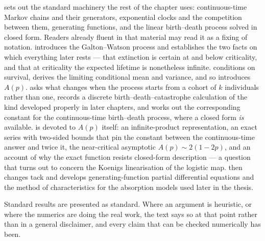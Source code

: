  sets out the standard machinery the rest of the chapter uses:
continuous-time Markov chains and their generators, exponential clocks and the
competition between them, generating functions, and the linear birth--death process
solved in closed form. Readers already fluent in that material may read it as a fixing
of notation.  introduces the Galton--Watson process and establishes the
two facts on which everything later rests --- that extinction is certain at and below
criticality, and that at criticality the expected lifetime is nonetheless infinite.
 conditions on survival, derives the limiting conditional mean and
variance, and so introduces $A(p)$.  asks what changes when the process
starts from a cohort of $k$ individuals rather than one, records a discrete
birth--death--catastrophe calculation of the kind developed properly in later chapters,
and works out the corresponding constant for the continuous-time birth--death process,
where a closed form \emph{is} available.  is devoted to $A(p)$ itself: an
infinite-product representation, an exact series with two-sided bounds that pin the
constant between the continuous-time answer and twice it, the near-critical asymptotic
$A(p)\sim2(1-2p)$, and an account of why the exact function resists closed-form
description --- a question that turns out to concern the Koenigs linearisation of the
logistic map.  then changes tack and develops generating-function partial
differential equations and the method of characteristics for the absorption models used
later in the thesis.

Standard results are presented as standard. Where an argument is heuristic, or where
the numerics are doing the real work, the text says so at that point rather than in a
general disclaimer, and every claim that can be checked numerically has been.
